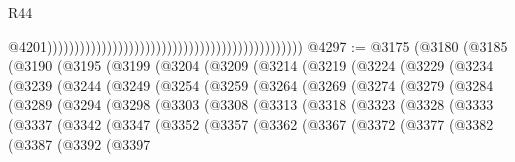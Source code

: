 \begin{lexlean}{R44}
\begin{coremodule}
{                                                                                                  @4201)))))))))))))))))))))))))))))))))))))))))))))))
@4297 := @3175
    (@3180
      (@3185
        (@3190
          (@3195
            (@3199
              (@3204
                (@3209
                  (@3214
                    (@3219
                      (@3224
                        (@3229
                          (@3234
                            (@3239
                              (@3244
                                (@3249
                                  (@3254
                                    (@3259
                                      (@3264
                                        (@3269
                                          (@3274
                                            (@3279
                                              (@3284
                                                (@3289
                                                  (@3294
                                                    (@3298
                                                      (@3303
                                                        (@3308
                                                          (@3313
                                                            (@3318
                                                              (@3323
                                                                (@3328
                                                                  (@3333
                                                                    (@3337
                                                                      (@3342
                                                                        (@3347
                                                                          (@3352
                                                                            (@3357
                                                                              (@3362
                                                                                (@3367
                                                                                  (@3372
                                                                                    (@3377
                                                                                      (@3382
                                                                                        (@3387
                                                                                          (@3392
                                                                                            (@3397
}
\end{coremodule}
\end{lexlean}
